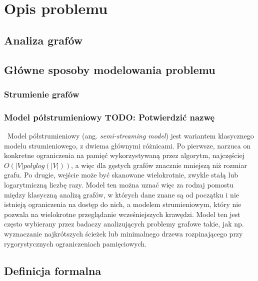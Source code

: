 \chapter{Opis problemu}

\section{Analiza grafów}

\section{Główne sposoby modelowania problemu}

    \subsection{Strumienie grafów}



    \subsection{Model półstrumieniowy TODO: Potwierdzić nazwę}\
        Model półstrumieniowy (ang. \emph{semi-streaming model})\cite{Feigenbaum_Kannan_McGregor_Suri_Zhang_2005} jest wariantem klasycznego modelu strumieniowego, z dwiema głównymi różnicami. Po pierwsze, narzuca on konkretne ograniczenia na pamięć wykorzystywaną przez algorytm, najczęściej $O(|V| polylog(|V|))$, a więc dla gęstych grafów znacznie mniejszą niż rozmiar grafu. Po drugie, wejście może być skanowane wielokrotnie, zwykle stałą lub logarytmiczną liczbę razy. Model ten można uznać więc za rodzaj pomostu między klasyczną analizą grafów, w których dane znane są od początku i nie istnieją ograniczenia na dostęp do nich, a modelem strumieniowym, który nie pozwala na wielokrotne przeglądanie wcześniejszych krawędzi. Model ten jest często wybierany przez badaczy analizujących problemy grafowe takie, jak np.  wyznaczanie najkrótszych ścieżek \cite{Elkin_Trehan_2022} lub minimalnego drzewa rozpinającego \cite{Ahn_Guha_McGregor_2012} przy rygorystycznych ograniczeniach pamięciowych.

\section{Definicja formalna}